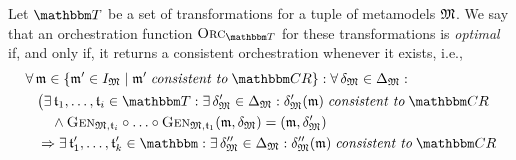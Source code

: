 \begin{definition}
    Let $\transformationset{T}$ be a set of transformations for a tuple of metamodels $\metamodeltuple{M}%
    $.
    We say that an orchestration function $\orcfunction{\transformationset{T}}$ for these transformations is \emph{optimal} if, and only if, it returns a consistent orchestration whenever it exists, i.e.,
    \begin{align*}
        &
        \forall \modeltuple{m} \in \setted{\modeltuple{m}' \in \metamodeltupleinstanceset{M} \mid \modeltuple{m}' \consistenttomath \consistencyrelationset{CR}} : \forall \changetuple{\metamodeltuple{M}} %
        \in \changeuniverse{\metamodeltuple{M}} : \\
        & \formulaskip
            \bigl(
            \exists \transformation{t}_{1}, \dots, \transformation{t}_{i} \in \transformationset{T} : 
            \exists \changetuple{\metamodeltuple{M}}' %
            \in \changeuniverse{\metamodeltuple{M}} : \changetuple{\metamodeltuple{M}}'(\modeltuple{m})
            \consistenttomath \consistencyrelationset{CR}\\
            & \formulaskip \formulaskip
            \land \generalizationfunction{\metamodeltuple{M}, \transformation{t}_{i}} \concatfunction \dots \concatfunction \generalizationfunction{\metamodeltuple{M}, \transformation{t}_{1}}(\modeltuple{m}, \changetuple{\metamodeltuple{M}}) = (\modeltuple{m}, \changetuple{\metamodeltuple{M}}')
            \\
            & \formulaskip
            \Rightarrow
            \exists \transformation{t}_{1}', \dots, \transformation{t}_{k}' \in \transformationset{} : 
            \exists \changetuple{\metamodeltuple{M}}'' %
            \in \changeuniverse{\metamodeltuple{M}} : \changetuple{\metamodeltuple{M}}''(\modeltuple{m}) \consistenttomath \consistencyrelationset{CR}\\

\end{align*}
\end{definition}
